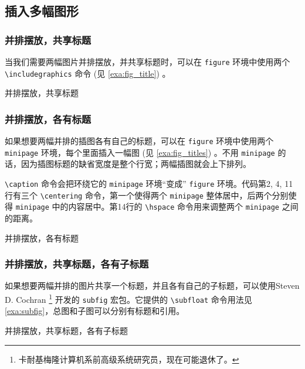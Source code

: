 \subsection{插入多幅图形}
\subsubsection{并排摆放，共享标题}

当我们需要两幅图片并排摆放，并共享标题时，可以在 \texttt{figure} 环境中使用两个 \verb|\includegraphics| 命令 (见 \autoref{exa:fig_title}) 。

\begin{example}[h]
\caption{并排摆放，共享标题}
\label{exa:fig_title}
\end{example}

\subsubsection{并排摆放，各有标题}

如果想要两幅并排的插图各有自己的标题，可以在 \texttt{figure} 环境中使用两个 \texttt{minipage} 环境，每个里面插入一幅图 (见 \autoref{exa:fig_titles}) 。不用 \texttt{minipage} 的话，因为插图标题的缺省宽度是整个行宽；两幅插图就会上下排列。

\verb|\caption| 命令会把环绕它的 \texttt{minipage} 环境“变成” \texttt{figure} 环境。代码第2, 4, 11行有三个 \verb|\centering| 命令，第一个使得两个 \texttt{minipage} 整体居中，后两个分别使得 \texttt{minipage} 中的内容居中。第14行的 \verb|\hspace| 命令用来调整两个 \texttt{minipage} 之间的距离。


\begin{example}[h]
\caption{并排摆放，各有标题}
\label{exa:fig_titles}
\end{example}

\subsubsection{并排摆放，共享标题，各有子标题}

如果想要两幅并排的图片共享一个标题，并且各有自己的子标题，可以使用Steven D. Cochran\indexCochran{} \footnote{卡耐基梅隆计算机系前高级系统研究员，现在可能退休了。} 开发的 \texttt{subfig} 宏包。它提供的 \verb|\subfloat| 命令用法见 \autoref{exa:subfig}，总图和子图可以分别有标题和引用。

\begin{example}[h]
\caption{并排摆放，共享标题，各有子标题}
\label{exa:subfig}
\end{example}

